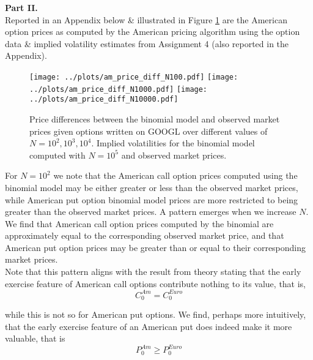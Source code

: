 \documentclass[12pt]{article}
\newlength\tindent
\renewcommand{\indent}{\hspace*{\tindent}}
\begin{document}
 
 
\newpage
{\bf Part II.} \\

\indent Reported in an Appendix below \& illustrated in Figure \ref{fig:am_price} are the American option prices as computed by the American pricing algorithm using the option data \& implied volatility estimates from Assignment 4 (also reported in the Appendix).

\begin{figure}[H]
	\centering
 	\texttt{[image: ../plots/am\_price\_diff\_N100.pdf]}
	\texttt{[image: ../plots/am\_price\_diff\_N1000.pdf]}
 	\texttt{[image: ../plots/am\_price\_diff\_N10000.pdf]}
\caption{\footnotesize Price differences between the binomial model and observed market prices given options written on GOOGL over different values of $N = 10^2, 10^3, 10^4$. Implied volatilities for the binomial model computed with $N = 10^5$ and observed market prices.}\label{fig:am_price}
\end{figure}

\indent For $N = 10^2$ we note that the American call option prices computed using the binomial model may be either greater or less than the observed market prices, while American put option binomial model prices are more restricted to being greater than the observed market prices. A pattern emerges when we increase $N$. We find that American call option prices computed by the binomial are approximately equal to the corresponding observed market price, and that American put option prices may be greater than or equal to their corresponding market prices. \\

\indent Note that this pattern aligns with the result from theory stating that the early exercise feature of American call options contribute nothing to its value, that is,
\begin{equation*}
	C^{Am}_0 = C^{Euro}_0
\end{equation*}

while this is not so for American put options. We find, perhaps more intuitively, that the early exercise feature of an American put does indeed make it more valuable, that is
\begin{equation*}
	P^{Am}_0 \geq P^{Euro}_0
\end{equation*}
\end{document}
